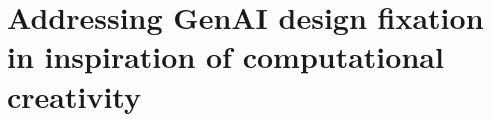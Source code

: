 \section{Addressing GenAI design fixation in inspiration of computational creativity}
\label{section_solution}






